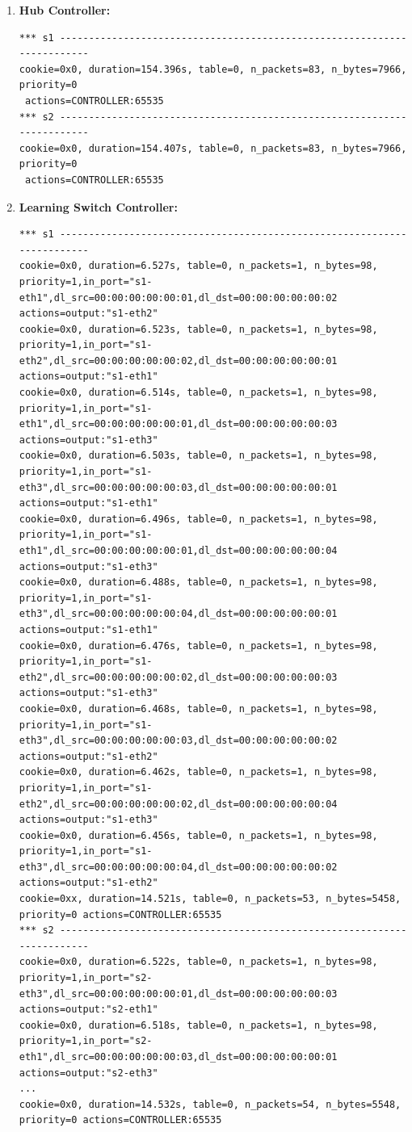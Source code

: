 \documentclass[12pt]{article}
\begin{document}
\begin{enumerate}
    \item \textbf{Hub Controller:}
    \begin{verbatim}
*** s1 ------------------------------------------------------------------------
cookie=0x0, duration=154.396s, table=0, n_packets=83, n_bytes=7966, priority=0 
 actions=CONTROLLER:65535
*** s2 ------------------------------------------------------------------------
cookie=0x0, duration=154.407s, table=0, n_packets=83, n_bytes=7966, priority=0 
 actions=CONTROLLER:65535
    \end{verbatim}

    \item \textbf{Learning Switch Controller:}
    \begin{verbatim}
*** s1 ------------------------------------------------------------------------
cookie=0x0, duration=6.527s, table=0, n_packets=1, n_bytes=98, priority=1,in_port="s1-eth1",dl_src=00:00:00:00:00:01,dl_dst=00:00:00:00:00:02 actions=output:"s1-eth2"
cookie=0x0, duration=6.523s, table=0, n_packets=1, n_bytes=98, priority=1,in_port="s1-eth2",dl_src=00:00:00:00:00:02,dl_dst=00:00:00:00:00:01 actions=output:"s1-eth1"
cookie=0x0, duration=6.514s, table=0, n_packets=1, n_bytes=98, priority=1,in_port="s1-eth1",dl_src=00:00:00:00:00:01,dl_dst=00:00:00:00:00:03 actions=output:"s1-eth3"
cookie=0x0, duration=6.503s, table=0, n_packets=1, n_bytes=98, priority=1,in_port="s1-eth3",dl_src=00:00:00:00:00:03,dl_dst=00:00:00:00:00:01 actions=output:"s1-eth1"
cookie=0x0, duration=6.496s, table=0, n_packets=1, n_bytes=98, priority=1,in_port="s1-eth1",dl_src=00:00:00:00:00:01,dl_dst=00:00:00:00:00:04 actions=output:"s1-eth3"
cookie=0x0, duration=6.488s, table=0, n_packets=1, n_bytes=98, priority=1,in_port="s1-eth3",dl_src=00:00:00:00:00:04,dl_dst=00:00:00:00:00:01 actions=output:"s1-eth1"
cookie=0x0, duration=6.476s, table=0, n_packets=1, n_bytes=98, priority=1,in_port="s1-eth2",dl_src=00:00:00:00:00:02,dl_dst=00:00:00:00:00:03 actions=output:"s1-eth3"
cookie=0x0, duration=6.468s, table=0, n_packets=1, n_bytes=98, priority=1,in_port="s1-eth3",dl_src=00:00:00:00:00:03,dl_dst=00:00:00:00:00:02 actions=output:"s1-eth2"
cookie=0x0, duration=6.462s, table=0, n_packets=1, n_bytes=98, priority=1,in_port="s1-eth2",dl_src=00:00:00:00:00:02,dl_dst=00:00:00:00:00:04 actions=output:"s1-eth3"
cookie=0x0, duration=6.456s, table=0, n_packets=1, n_bytes=98, priority=1,in_port="s1-eth3",dl_src=00:00:00:00:00:04,dl_dst=00:00:00:00:00:02 actions=output:"s1-eth2"
cookie=0xx, duration=14.521s, table=0, n_packets=53, n_bytes=5458, priority=0 actions=CONTROLLER:65535
*** s2 ------------------------------------------------------------------------
cookie=0x0, duration=6.522s, table=0, n_packets=1, n_bytes=98, priority=1,in_port="s2-eth3",dl_src=00:00:00:00:00:01,dl_dst=00:00:00:00:00:03 actions=output:"s2-eth1"
cookie=0x0, duration=6.518s, table=0, n_packets=1, n_bytes=98, priority=1,in_port="s2-eth1",dl_src=00:00:00:00:00:03,dl_dst=00:00:00:00:00:01 actions=output:"s2-eth3"
...
cookie=0x0, duration=14.532s, table=0, n_packets=54, n_bytes=5548, priority=0 actions=CONTROLLER:65535
    \end{verbatim}
\end{enumerate}
\end{document}
